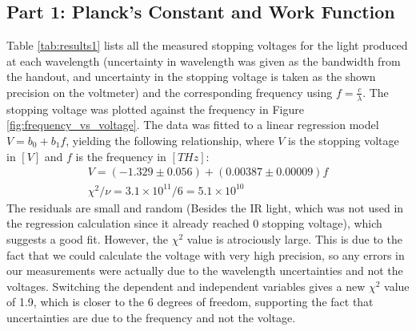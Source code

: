 \subsection{Part 1: Planck's Constant and Work Function}
\label{sec:results1}
Table \ref{tab:results1} lists all the measured stopping voltages for the light produced at each wavelength (uncertainty in wavelength was given as the bandwidth from the handout, and uncertainty in the stopping voltage is taken as the shown precision on the voltmeter) and the corresponding frequency using $f = \frac{c}{\lambda}$. The stopping voltage was plotted against the frequency in Figure \ref{fig:frequency_vs_voltage}. The data was fitted to a linear regression model $V = b_0 + b_1f$, yielding the following relationship, where $V$ is the stopping voltage in $[V]$ and $f$ is the frequency in $[THz]$:
\begin{gather}
    V = (-1.329 \pm 0.056) + (0.00387 \pm 0.00009)f \\
    \chi^2 / \nu = 3.1 \times 10^{11} / 6 = 5.1 \times 10^{10}
\end{gather}
The residuals are small and random (Besides the IR light, which was not used in the regression calculation since it already reached 0 stopping voltage), which suggests a good fit. However, the $\chi^2$ value is atrociously large. This is due to the fact that we could calculate the voltage with very high precision, so any errors in our measurements were actually due to the wavelength uncertainties and not the voltages. Switching the dependent and independent variables gives a new $\chi^2$ value of 1.9, which is closer to the 6 degrees of freedom, supporting the fact that uncertainties are due to the frequency and not the voltage.


